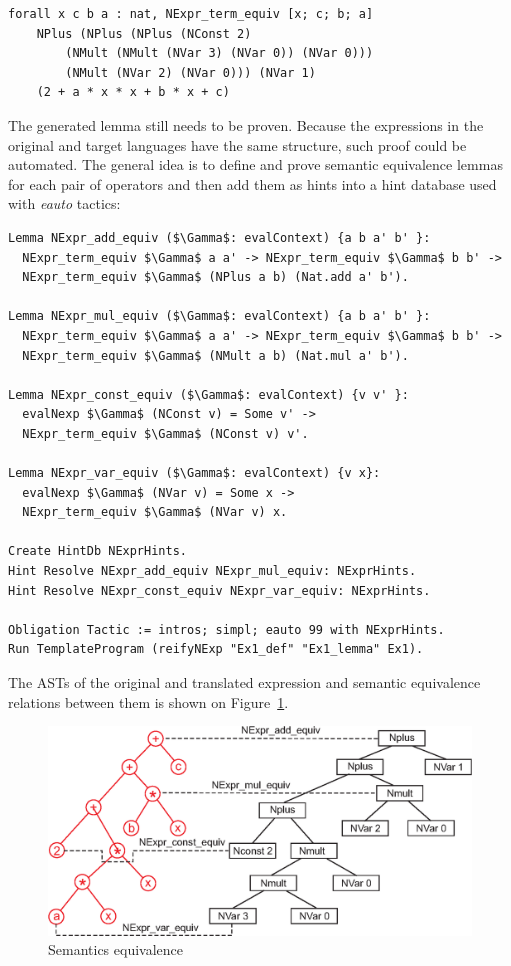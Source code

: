 \documentclass[sigplan]{acmart}\settopmatter{printfolios=true,printccs=false,printacmref=false}
\begin{document}
\begin{lstlisting}[language=Coq, mathescape=true,
  frame=single, basicstyle=\footnotesize]
forall x c b a : nat, NExpr_term_equiv [x; c; b; a]
    NPlus (NPlus (NPlus (NConst 2)
        (NMult (NMult (NVar 3) (NVar 0)) (NVar 0)))
        (NMult (NVar 2) (NVar 0))) (NVar 1)
    (2 + a * x * x + b * x + c)
\end{lstlisting}

The generated lemma still needs to be proven. Because the expressions
in the original and target languages have the same structure, such proof
could be automated. The general idea is to define and prove semantic
equivalence lemmas for each pair of operators and then add them as
hints into a hint database used with \emph{eauto} tactics:

\begin{lstlisting}[language=Coq, mathescape=true,
  frame=single, basicstyle=\footnotesize]
Lemma NExpr_add_equiv ($\Gamma$: evalContext) {a b a' b' }:
  NExpr_term_equiv $\Gamma$ a a' -> NExpr_term_equiv $\Gamma$ b b' ->
  NExpr_term_equiv $\Gamma$ (NPlus a b) (Nat.add a' b').

Lemma NExpr_mul_equiv ($\Gamma$: evalContext) {a b a' b' }:
  NExpr_term_equiv $\Gamma$ a a' -> NExpr_term_equiv $\Gamma$ b b' ->
  NExpr_term_equiv $\Gamma$ (NMult a b) (Nat.mul a' b').

Lemma NExpr_const_equiv ($\Gamma$: evalContext) {v v' }:
  evalNexp $\Gamma$ (NConst v) = Some v' ->
  NExpr_term_equiv $\Gamma$ (NConst v) v'.

Lemma NExpr_var_equiv ($\Gamma$: evalContext) {v x}:
  evalNexp $\Gamma$ (NVar v) = Some x ->
  NExpr_term_equiv $\Gamma$ (NVar v) x.

Create HintDb NExprHints.
Hint Resolve NExpr_add_equiv NExpr_mul_equiv: NExprHints.
Hint Resolve NExpr_const_equiv NExpr_var_equiv: NExprHints.

Obligation Tactic := intros; simpl; eauto 99 with NExprHints.
Run TemplateProgram (reifyNExp "Ex1_def" "Ex1_lemma" Ex1).
\end{lstlisting}

The ASTs of the original and translated expression and semantic
equivalence relations between them is shown on Figure~\ref{fig:trees}.

\begin{figure}[h]
  \label{fig:trees}
  \includegraphics[width=\columnwidth]{trees.eps}
  \caption{Semantics equivalence}
\end{figure}
\end{document}

